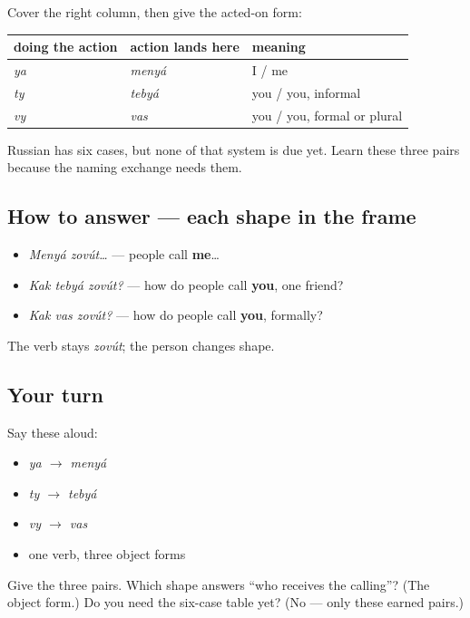 \begin{grammarlens}[title={Grammar lens — cover and retrieve}]
Cover the right column, then give the acted-on form:

\noindent
\begin{tabularx}{\linewidth}{@{}>{\raggedright\arraybackslash}X>{\raggedright\arraybackslash}X>{\raggedright\arraybackslash}X@{}}
\toprule
\textbf{doing the action} & \textbf{action lands here} & \textbf{meaning} \\
\midrule
\emph{ya} & \emph{menyá} & I / me \\
\emph{ty} & \emph{tebyá} & you / you, informal \\
\emph{vy} & \emph{vas} & you / you, formal or plural \\
\bottomrule
\end{tabularx}

Russian has six cases, but none of that system is due yet. Learn these three pairs because the naming exchange needs them.
\end{grammarlens}

\subsection*{How to answer — each shape in the frame}
\begin{itemize}
\raggedright
  \item \emph{Menyá zovút…} — people call \textbf{me}…
  \item \emph{Kak tebyá zovút?} — how do people call \textbf{you}, one friend?
  \item \emph{Kak vas zovút?} — how do people call \textbf{you}, formally?
\end{itemize}

The verb stays \emph{zovút}; the person changes shape.

\subsection*{Your turn}
Say these aloud:

\begin{itemize}
\raggedright
  \item \emph{ya $\to$ menyá}
  \item \emph{ty $\to$ tebyá}
  \item \emph{vy $\to$ vas}
  \item one verb, three object forms
\end{itemize}

\begin{tcolorbox}[breakable,colback=teal!4,colframe=teal!35!black,title={Before you move on}]
Give the three pairs. Which shape answers \textquotedblleft{}who receives the calling\textquotedblright{}? (The object form.) Do you need the six-case table yet? (No — only these earned pairs.)
\end{tcolorbox}
